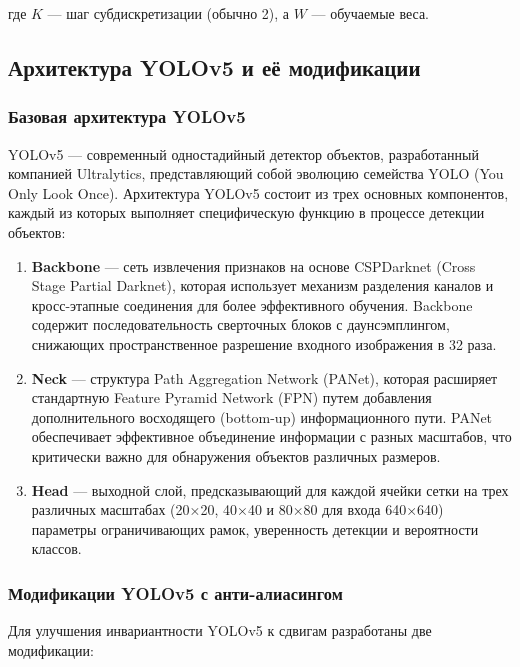 где $K$ — шаг субдискретизации (обычно 2), а $W$ — обучаемые веса.

\subsection{Архитектура YOLOv5 и её модификации}
\label{sec:yolov5}

\subsubsection{Базовая архитектура YOLOv5}
\label{sec:yolov5:base}

YOLOv5 — современный одностадийный детектор объектов, разработанный компанией Ultralytics, представляющий собой эволюцию семейства YOLO (You Only Look Once). Архитектура YOLOv5 состоит из трех основных компонентов, каждый из которых выполняет специфическую функцию в процессе детекции объектов:

\begin{enumerate}
    \item \textbf{Backbone} — сеть извлечения признаков на основе CSPDarknet (Cross Stage Partial Darknet), которая использует механизм разделения каналов и кросс-этапные соединения для более эффективного обучения. Backbone содержит последовательность сверточных блоков с даунсэмплингом, снижающих пространственное разрешение входного изображения в 32 раза.
    
    \item \textbf{Neck} — структура Path Aggregation Network (PANet), которая расширяет стандартную Feature Pyramid Network (FPN) путем добавления дополнительного восходящего (bottom-up) информационного пути. PANet обеспечивает эффективное объединение информации с разных масштабов, что критически важно для обнаружения объектов различных размеров.
    
    \item \textbf{Head} — выходной слой, предсказывающий для каждой ячейки сетки на трех различных масштабах (20×20, 40×40 и 80×80 для входа 640×640) параметры ограничивающих рамок, уверенность детекции и вероятности классов.
\end{enumerate}

\subsubsection{Модификации YOLOv5 с анти-алиасингом}
\label{sec:yolov5:modifications}

Для улучшения инвариантности YOLOv5 к сдвигам разработаны две модификации:

